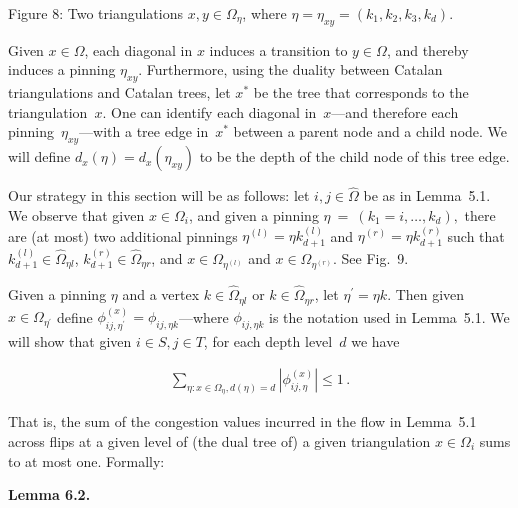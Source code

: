 Figure 8: Two triangulations $x,y\in\Omega_{\eta}$, where $\eta=\eta_{xy}=(k_{1},k_{2},k_{3},k_{d})$.



Given $x\in\Omega$, each diagonal in $x$ induces a transition to $y\in\Omega$, and thereby induces a pinning $\eta_{xy}$. Furthermore, using the duality between Catalan triangulations and Catalan trees, let $x^{*}$ be the tree that corresponds to the triangulation $x$. One can identify each diagonal in $x$—and therefore each pinning $\eta_{xy}$—with a tree edge in $x^{*}$ between a parent node and a child node. We will define $d_{x}(\eta)=d_{x}(\eta_{xy})$ to be the depth of the child node of this tree edge.\par




Our strategy in this section will be as follows: let $i,j\in\hat{\Omega}$ be as in Lemma 5.1. We observe that given $x\in\Omega_{i}$, and given a pinning $\eta~=~(k_{1}=i,\dots,k_{d}),$ there are (at most) two additional pinnings $\eta^{(l)}=\eta k_{d+1}^{(l)}$ and $\eta^{(r)}=\eta k_{d+1}^{(r)}$ such that $k_{d+1}^{(l)}\in\hat{\Omega}_{\eta l}$, $k_{d+1}^{(r)}\in\hat{\Omega}_{\eta r}$, and $x\in\Omega_{\eta^{(l)}}$ and $x\in\Omega_{\eta^{(r)}}$. See Fig. 9.\par




Given a pinning $\eta$ and a vertex $k\in\hat{\Omega}_{\eta l}$ or $k\in\hat{\Omega}_{\eta r}$, let $\eta^{\prime}=\eta k$. Then given $x\in\Omega_{\eta^{\prime}}$ define $\phi_{ij,\eta^{\prime}}^{(x)}=\phi_{ij,\eta k}$—where $\phi_{ij,\eta k}$ is the notation used in Lemma 5.1. We will show that given $i\in S,j\in T$, for each depth level $d$ we have\par


\[\begin{gathered}
\sum_{\eta:x\in\Omega_{\eta},d(\eta)=d}|\phi_{ij,\eta}^{(x)}|\leq 1\,.
\end{gathered}\]


That is, the sum of the congestion values incurred in the flow in Lemma 5.1 across flips at a given level of (the dual tree of) a given triangulation $x\in\Omega_{i}$ sums to at most one. Formally:\par





\par\medskip\noindent\textbf{\textbf{Lemma 6.2}\textbf{.}}\par



